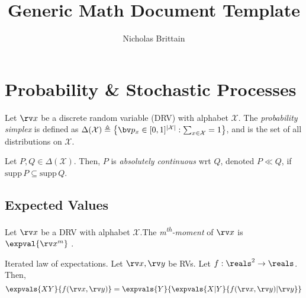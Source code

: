 \documentclass[11pt]{article}
\title{Generic Math Document Template}
\author{Nicholas Brittain}
\begin{document}
	
\maketitle

\newcommand{\xalph}{\mathcal{X}}
\newcommand{\yalph}{\mathcal{Y}}
\newcommand{\zalph}{\mathcal{Z}}
\newcommand{\xsimp}{\Delta(\xalph)}
\newcommand{\ysimp}{\Delta(\yalph)}
\newcommand{\zsimp}{\Delta(\zalph)}
\newcommand{\letxbeadrv}{Let $\rv x$ be a DRV with alphabet $\xalph$.}

\makenomenclature %
\printnomenclature

\section{Probability \& Stochastic Processes}

\begin{defn}
  Let $\rv x$ be a discrete random variable (DRV) with alphabet $\mathcal{X}$. The \emph{probability simplex} is defined as $\Delta (\xalph) \triangleq \left\{\bv p_x \in [0,1]^{|\xalph|} : \sum_{x\in\xalph} = 1 \right\}$, and is the set of all distributions on $\xalph$.
\end{defn}

\begin{defn}
  Let $P,Q\in\Delta(\xalph)$. Then, $P$ is \emph{absolutely continuous} wrt $Q$, denoted $P\ll Q$, if $\mathrm{supp}\,P \subseteq \mathrm{supp}\,Q$.
\end{defn}


\subsection{Expected Values}

\begin{defn}
  \letxbeadrv The \emph{m\textsuperscript{th}-moment} of $\rv x$ is $\expval{\rv x^m}$ .
\end{defn}

\begin{lemma}\label{lem:iterated_law_of_expvals} Iterated law of expectations.
  Let $\rv x, \rv y$ be RVs. Let $f:\reals^2 \rightarrow \reals$. Then,
  \begin{equation}
    \expvals{XY}{f(\rv x, \rv y)} = \expvals{Y}{\expvals{X|Y}{f(\rv x, \rv y) | \rv y}}
  \end{equation}
\end{lemma}
\end{document}
